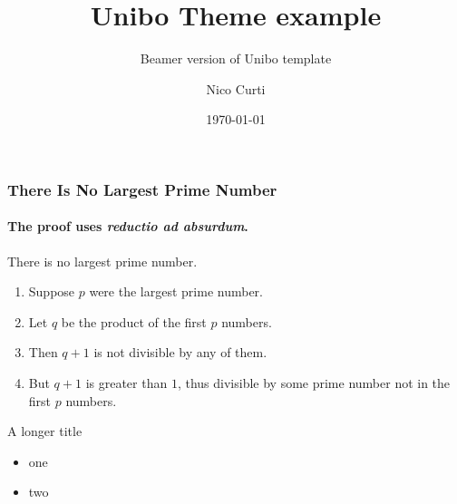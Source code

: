 \documentclass{beamer}
\title{Unibo Theme example}
\subtitle{Beamer version of Unibo template}
\date[\today]{\today}
\author[Nico Curti]{Nico Curti}
\begin{document}
\begin{frame}
\titlepage
\end{frame}


\begin{frame}

\frametitle{There Is No Largest Prime Number}
\framesubtitle{The proof uses \textit{reductio ad absurdum}.}

\begin{theorem}

There is no largest prime number.

\end{theorem}

\begin{enumerate}

  \item<1-| alert@1> Suppose $p$ were the largest prime number.
  \item<2-> Let $q$ be the product of the first $p$ numbers.
  \item<3-> Then $q+1$ is not divisible by any of them.
  \item<1-> But $q + 1$ is greater than $1$, thus divisible by some prime
  number not in the first $p$ numbers.

\end{enumerate}

\end{frame}

\begin{frame}{A longer title}

\begin{itemize}
  \item one
  \item two
\end{itemize}

\end{frame}
\end{document}
